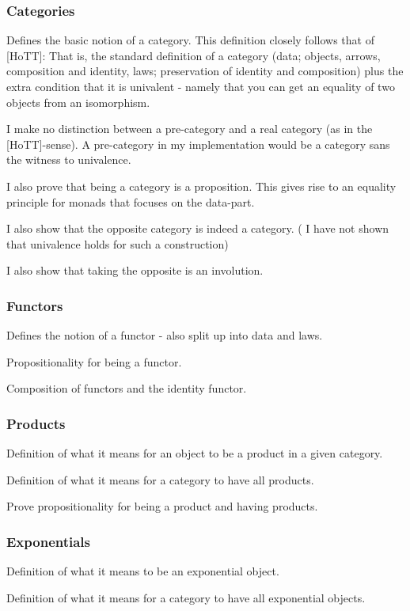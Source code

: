 \subsubsection{Categories}
Defines the basic notion of a category. This definition closely follows that of
[HoTT]: That is, the standard definition of a category (data; objects, arrows,
composition and identity, laws; preservation of identity and composition) plus
the extra condition that it is univalent - namely that you can get an equality
of two objects from an isomorphism.

I make no distinction between a pre-category and a real category (as in the
[HoTT]-sense). A pre-category in my implementation would be a category sans the
witness to univalence.

I also prove that being a category is a proposition. This gives rise to an
equality principle for monads that focuses on the data-part.

I also show that the opposite category is indeed a category. (\WIP{} I have not
shown that univalence holds for such a construction)

I also show that taking the opposite is an involution.

\subsubsection{Functors}
Defines the notion of a functor - also split up into data and laws.

Propositionality for being a functor.

Composition of functors and the identity functor.

\subsubsection{Products}
Definition of what it means for an object to be a product in a given category.

Definition of what it means for a category to have all products.

\WIP{} Prove propositionality for being a product and having products.

\subsubsection{Exponentials}
Definition of what it means to be an exponential object.

Definition of what it means for a category to have all exponential objects.

